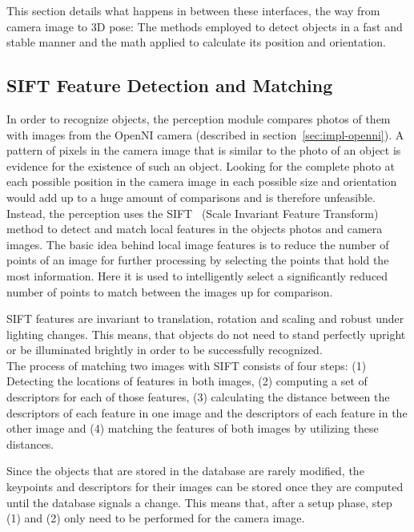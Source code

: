 This section details what happens in between these interfaces, the way from camera image to 3D pose: The methods employed to detect objects in a fast and stable manner and the math applied to calculate its position and orientation.

\subsection{SIFT Feature Detection and Matching}
\label{sec:impl-sift}
In order to recognize objects, the perception module compares photos of them with images from the OpenNI camera (described in section~\ref{sec:impl-openni}). A pattern of pixels in the camera image that is similar to the photo of an object is evidence for the existence of such an object. Looking for the complete photo at each possible position in the camera image in each possible size and orientation would add up to a huge amount of comparisons and is therefore unfeasible. \\

Instead, the perception uses the SIFT~\cite{sift_lowe} (Scale Invariant Feature Transform) method to detect and match local features in the objects photos and camera images. The basic idea behind local image features is to reduce the number of points of an image for further processing by selecting the points that hold the most information. Here it is used to intelligently select a significantly reduced number of points to match between the images up for comparison.

SIFT features are invariant to translation, rotation and scaling and robust under lighting changes. This means, that objects do not need to stand perfectly upright or be illuminated brightly in order to be successfully recognized. \\

The process of matching two images with SIFT consists of four steps: (1) Detecting the locations of features in both images, (2) computing a set of descriptors for each of those features, (3) calculating the distance between the descriptors of each feature in one image and the descriptors of each feature in the other image and (4) matching the features of both images by utilizing these distances.

Since the objects that are stored in the database are rarely modified, the keypoints and descriptors for their images can be stored once they are computed until the database signals a change. This means that, after a setup phase, step (1) and (2) only need to be performed for the camera image.

